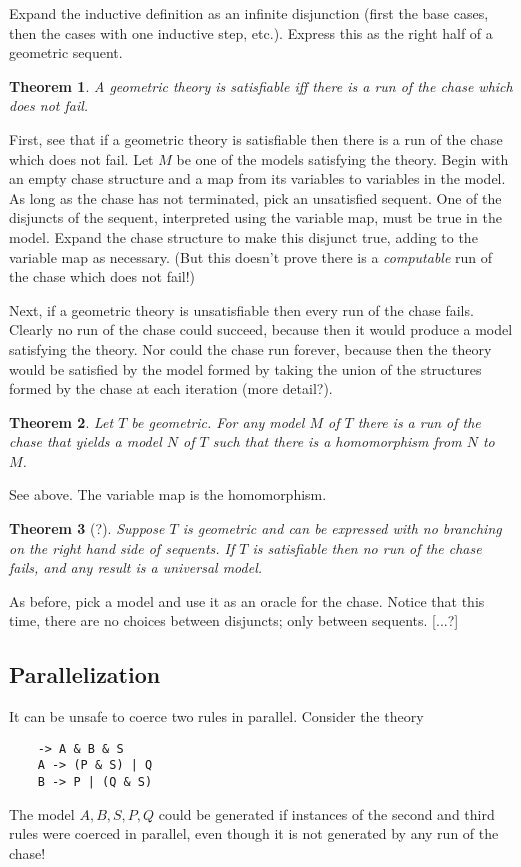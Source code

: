 \documentclass[12pt]{article}
\newtheorem{theorem}{Theorem}
\begin{document}
Expand the inductive definition as an infinite disjunction (first the
base cases, then the cases with one inductive step, etc.). Express
this as the right half of a geometric sequent.

\begin{theorem}
A geometric theory is satisfiable iff there is a run of the chase
which does not fail.
\end{theorem}

First, see that if a geometric theory is satisfiable then there is a
run of the chase which does not fail. Let $M$ be one of the models
satisfying the theory. Begin with an empty chase structure and a map
from its variables to variables in the model. As long as the chase has
not terminated, pick an unsatisfied sequent. One of the disjuncts of
the sequent, interpreted using the variable map, must be true in the
model. Expand the chase structure to make this disjunct true, adding
to the variable map as necessary. (But this doesn't prove there is a
\emph{computable} run of the chase which does not fail!)

Next, if a geometric theory is unsatisfiable then every run of the
chase fails. Clearly no run of the chase could succeed, because then
it would produce a model satisfying the theory. Nor could the chase
run forever, because then the theory would be satisfied by the model
formed by taking the union of the structures formed by the chase at
each iteration (more detail?).

\begin{theorem}
Let $T$ be geometric.  For any model $M$ of $T$ there is a run of the
chase that yields a model $N$ of $T$ such that there is a homomorphism
from $N$ to $M$.
\end{theorem}

See above.  The variable map is the homomorphism.

\begin{theorem}
[?] Suppose $T$ is geometric and can be expressed with no branching on
the right hand side of sequents.  If $T$ is satisfiable then no run of
the chase fails, and any result is a universal model.
\end{theorem}

As before, pick a model and use it as an oracle for the chase. Notice
that this time, there are no choices between disjuncts; only between
sequents. [...?]


\subsection{Parallelization}
It can be unsafe to coerce two rules in parallel. Consider the theory
\begin{verbatim}
    -> A & B & S
    A -> (P & S) | Q
    B -> P | (Q & S)
\end{verbatim}
The model ${A, B, S, P, Q}$ could be generated if instances of the
second and third rules were coerced in parallel, even though it is not
generated by any run of the chase!
\end{document}
